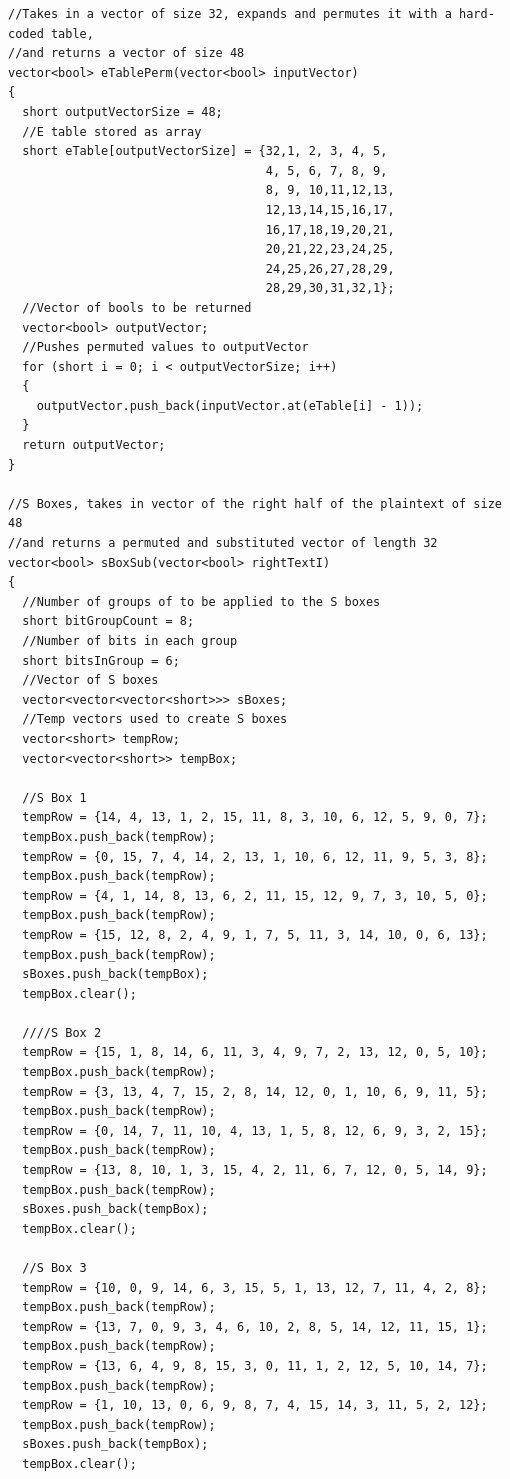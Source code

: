 \documentclass[11pt]{article}
\begin{document}
\begin{verbatim}
//Takes in a vector of size 32, expands and permutes it with a hard-coded table,
//and returns a vector of size 48
vector<bool> eTablePerm(vector<bool> inputVector)
{
  short outputVectorSize = 48;
  //E table stored as array
  short eTable[outputVectorSize] = {32,1, 2, 3, 4, 5,
                                    4, 5, 6, 7, 8, 9,
                                    8, 9, 10,11,12,13,
                                    12,13,14,15,16,17,
                                    16,17,18,19,20,21,
                                    20,21,22,23,24,25,
                                    24,25,26,27,28,29,
                                    28,29,30,31,32,1};
  //Vector of bools to be returned
  vector<bool> outputVector;
  //Pushes permuted values to outputVector
  for (short i = 0; i < outputVectorSize; i++)
  {
    outputVector.push_back(inputVector.at(eTable[i] - 1));
  }
  return outputVector;
}

//S Boxes, takes in vector of the right half of the plaintext of size 48
//and returns a permuted and substituted vector of length 32
vector<bool> sBoxSub(vector<bool> rightTextI)
{
  //Number of groups of to be applied to the S boxes
  short bitGroupCount = 8;
  //Number of bits in each group
  short bitsInGroup = 6;
  //Vector of S boxes
  vector<vector<vector<short>>> sBoxes;
  //Temp vectors used to create S boxes
  vector<short> tempRow;
  vector<vector<short>> tempBox;

  //S Box 1
  tempRow = {14, 4, 13, 1, 2, 15, 11, 8, 3, 10, 6, 12, 5, 9, 0, 7};
  tempBox.push_back(tempRow);
  tempRow = {0, 15, 7, 4, 14, 2, 13, 1, 10, 6, 12, 11, 9, 5, 3, 8};
  tempBox.push_back(tempRow);
  tempRow = {4, 1, 14, 8, 13, 6, 2, 11, 15, 12, 9, 7, 3, 10, 5, 0};
  tempBox.push_back(tempRow);
  tempRow = {15, 12, 8, 2, 4, 9, 1, 7, 5, 11, 3, 14, 10, 0, 6, 13};
  tempBox.push_back(tempRow);
  sBoxes.push_back(tempBox);
  tempBox.clear();

  ////S Box 2
  tempRow = {15, 1, 8, 14, 6, 11, 3, 4, 9, 7, 2, 13, 12, 0, 5, 10};
  tempBox.push_back(tempRow);
  tempRow = {3, 13, 4, 7, 15, 2, 8, 14, 12, 0, 1, 10, 6, 9, 11, 5};
  tempBox.push_back(tempRow);
  tempRow = {0, 14, 7, 11, 10, 4, 13, 1, 5, 8, 12, 6, 9, 3, 2, 15};
  tempBox.push_back(tempRow);
  tempRow = {13, 8, 10, 1, 3, 15, 4, 2, 11, 6, 7, 12, 0, 5, 14, 9};
  tempBox.push_back(tempRow);
  sBoxes.push_back(tempBox);
  tempBox.clear();

  //S Box 3
  tempRow = {10, 0, 9, 14, 6, 3, 15, 5, 1, 13, 12, 7, 11, 4, 2, 8};
  tempBox.push_back(tempRow);
  tempRow = {13, 7, 0, 9, 3, 4, 6, 10, 2, 8, 5, 14, 12, 11, 15, 1};
  tempBox.push_back(tempRow);
  tempRow = {13, 6, 4, 9, 8, 15, 3, 0, 11, 1, 2, 12, 5, 10, 14, 7};
  tempBox.push_back(tempRow);
  tempRow = {1, 10, 13, 0, 6, 9, 8, 7, 4, 15, 14, 3, 11, 5, 2, 12};
  tempBox.push_back(tempRow);
  sBoxes.push_back(tempBox);
  tempBox.clear();


\end{verbatim}
\end{document}
